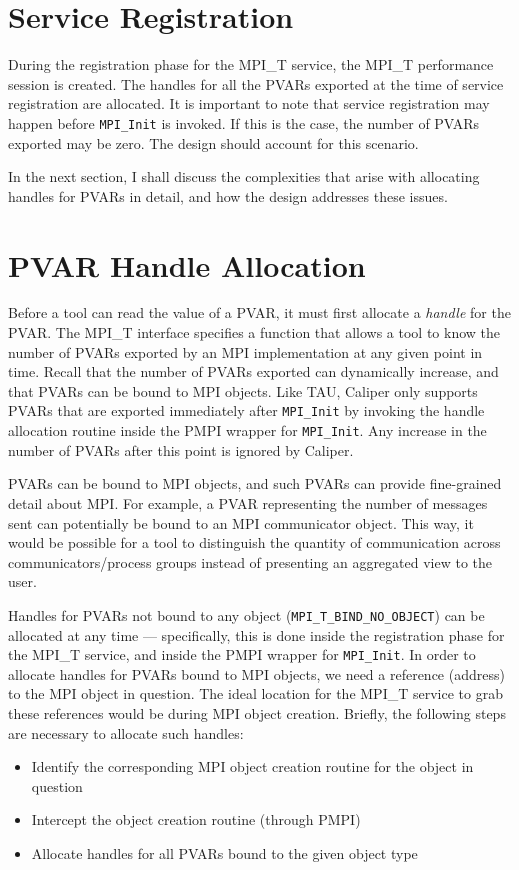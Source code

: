 \section{Service Registration}
During the registration phase for the MPI\_T service, the MPI\_T performance session is created. The handles for all the PVARs exported at the time of service registration are allocated. It is important to note that service registration may happen before \verb+MPI_Init+ is invoked. If this is the case, the number of PVARs exported may be zero. The design should account for this scenario.
\par In the next section, I shall discuss the complexities that arise with allocating handles for PVARs in detail, and how the design addresses these issues.
\section{PVAR Handle Allocation}
Before a tool can read the value of a PVAR, it must first allocate a \emph{handle} for the PVAR. The MPI\_T interface specifies a function that allows a tool to know the number of PVARs exported by an MPI implementation at any given point in time. Recall that the number of PVARs exported can dynamically increase, and that PVARs can be bound to MPI objects. Like TAU, Caliper only supports PVARs that are exported immediately after \verb+MPI_Init+ by invoking the handle allocation routine inside the PMPI wrapper for \verb+MPI_Init+. Any increase in the number of PVARs after this point is ignored by Caliper. 
\par PVARs can be bound to MPI objects, and such PVARs can provide fine-grained detail about MPI. For example, a PVAR representing the number of messages sent can potentially be bound to an MPI communicator object. This way, it would be possible for a tool to distinguish the quantity of communication across communicators/process groups instead of presenting an aggregated view to the user.
\par Handles for PVARs not bound to any object (\verb+MPI_T_BIND_NO_OBJECT+) can be allocated at any time --- specifically, this is done inside the registration phase for the MPI\_T service, and inside the PMPI wrapper for \verb+MPI_Init+. In order to allocate handles for PVARs bound to MPI objects, we need a reference (address) to the MPI object in question. The ideal location for the MPI\_T service to grab these references would be during MPI object creation. Briefly, the following steps are necessary to allocate such handles:
\begin{itemize}
\item Identify the corresponding MPI object creation routine for the object in question
\item Intercept the object creation routine (through PMPI)
\item Allocate handles for all PVARs bound to the given object type
\end{itemize}
